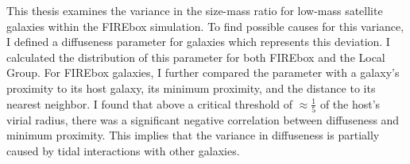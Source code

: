 


This thesis examines the variance in the size-mass ratio for low-mass satellite galaxies within the FIREbox simulation. To find possible causes for this variance, I defined a diffuseness parameter for galaxies which represents this deviation. I calculated the distribution of this parameter for both FIREbox and the Local Group. For FIREbox galaxies, I further compared the parameter with a galaxy's proximity to its host galaxy, its minimum proximity, and the distance to its nearest neighbor. I found that above a critical threshold of $\approx\frac{1}{5}$ of the host's virial radius, there was a significant negative correlation between diffuseness and minimum proximity. This implies that the variance in diffuseness is partially caused by tidal interactions with other galaxies.